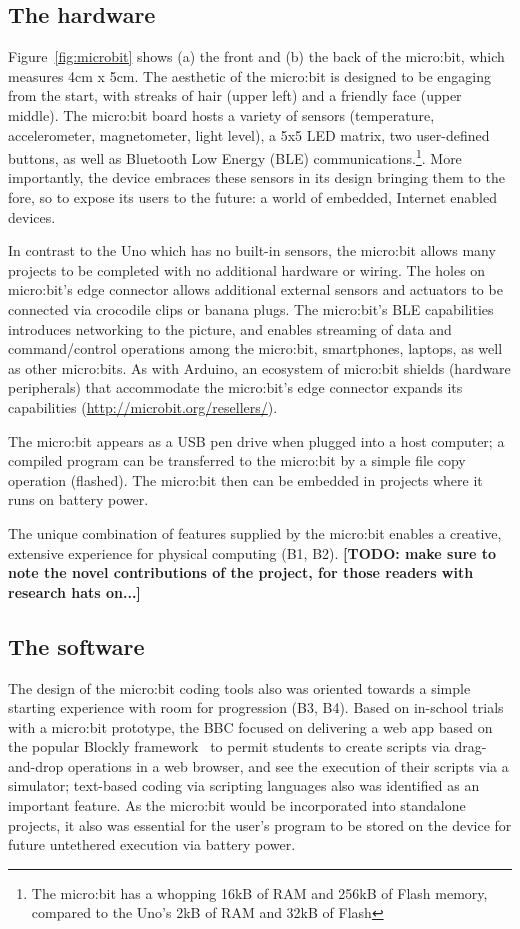 \subsection{The hardware}

Figure~\ref{fig:microbit} shows (a) the front and (b) the back of the
micro:bit, which measures 4cm x 5cm. The aesthetic of the micro:bit is designed to be engaging from the start, with streaks of hair (upper left) and a friendly face (upper middle).
The micro:bit board hosts a variety of sensors (temperature, accelerometer, magnetometer,
light level), a 5x5 LED matrix, two user-defined buttons, as well as Bluetooth
Low Energy (BLE) communications.\footnote{The micro:bit has a whopping
16kB of RAM and 256kB of Flash memory, compared to the Uno's 2kB of
RAM and 32kB of Flash}. More importantly, the device embraces these sensors in its design bringing them to the fore, so to expose its users to the future: a world of embedded, Internet enabled devices.

In contrast to the Uno which has no built-in sensors, the micro:bit
allows many projects to be completed with no additional hardware or wiring.
The holes on micro:bit's edge connector allows additional external sensors 
and actuators to be connected via crocodile clips or banana plugs.
The micro:bit's BLE capabilities introduces networking to the
picture, and enables streaming of data and command/control operations among the micro:bit,
smartphones, laptops, as well as other micro:bits.
As with Arduino, an ecosystem of micro:bit shields
(hardware peripherals) that accommodate the micro:bit's edge
connector expands its capabilities (\url{http://microbit.org/resellers/}).

The micro:bit appears as a USB pen drive when plugged into a host computer;
a compiled program can be transferred to the micro:bit by a simple file copy
operation (flashed). The micro:bit then can be embedded in projects
where it runs on battery power.

The unique combination of features supplied by the micro:bit enables a creative,
extensive experience for physical computing (B1, B2). 
{\bf [TODO: make sure to note the novel contributions of the project, for those
readers with research hats on...]}

\subsection{The software}

The design of the micro:bit coding tools also was oriented towards a
simple starting experience with room for progression (B3, B4). Based on in-school trials with a micro:bit prototype, the BBC focused on delivering a web app
based on the popular Blockly framework~\cite{Blocky2015} to permit students to
create scripts via drag-and-drop operations in a web browser, and see
the execution of their scripts via a simulator; text-based coding via scripting languages also
was identified as an important feature. As the micro:bit would be incorporated
into standalone projects, it also was essential for the user's program to be stored on the device for future untethered execution via battery power.

